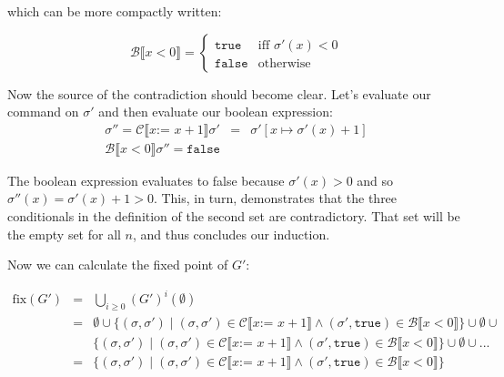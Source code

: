 \documentclass[10pt, oneside]{article}
\begin{document}
\begin{enumerate}[1.]
\begin{enumerate} [(a)]
			which can be more compactly written:
			
			$$\mathcal{B} \llbracket x < 0 \rrbracket = \left \{ 
			  \begin{array}{lr} 
			    \texttt{true}  & \text{iff } \sigma'(x) < 0 \\
			    \texttt{false} & \text{otherwise}
			  \end{array} \right.$$
			    
		  Now the source of the contradiction should become clear. Let's evaluate
		  our command on $\sigma'$ and then evaluate our boolean expression:
			\begin{eqnarray*}
			  \sigma'' = \mathcal{C} \llbracket x \texttt{:= } x + 1 \rrbracket \sigma' & = & \sigma'[x \mapsto \sigma'(x) + 1] \\
			  \mathcal{B} \llbracket x < 0 \rrbracket \sigma'' = \texttt{false}
			\end{eqnarray*}
			
			The boolean expression evaluates to false because $\sigma'(x) > 0$ and so 
			$\sigma''(x) = \sigma'(x) + 1 > 0$. This, in turn, demonstrates that the 
			three conditionals in the definition of the second set are contradictory. 
			That set will be the empty set for all $n$, and thus concludes our induction. \checkmark
			
			\vspace{4mm}
			
			
			Now we can calculate the fixed point of $G'$:
	
			
			\begin{eqnarray*}
			  \text{fix}(G') & = & \bigcup_{i \geq 0} (G')^{i}(\emptyset) \\
			  & = & \emptyset \cup \{ (\sigma, \sigma') \mid (\sigma, \sigma') \in \mathcal{C} \llbracket x \texttt{:= } x + 1 \rrbracket \wedge (\sigma', \texttt{true}) \in \mathcal{B} \llbracket x < 0 \rrbracket \} \cup \emptyset \cup\\
			  & & \{ (\sigma, \sigma') \mid (\sigma, \sigma') \in \mathcal{C} \llbracket x \texttt{:= } x + 1 \rrbracket \wedge (\sigma', \texttt{true}) \in \mathcal{B} \llbracket x < 0 \rrbracket \} \cup \emptyset \cup ... \\
			  & = & \{ (\sigma, \sigma') \mid (\sigma, \sigma') \in \mathcal{C} \llbracket x \texttt{:= } x + 1 \rrbracket \wedge (\sigma', \texttt{true}) \in \mathcal{B} \llbracket x < 0 \rrbracket \} \\
			\end{eqnarray*}
			

\end{enumerate}
\end{enumerate}
\end{document}
